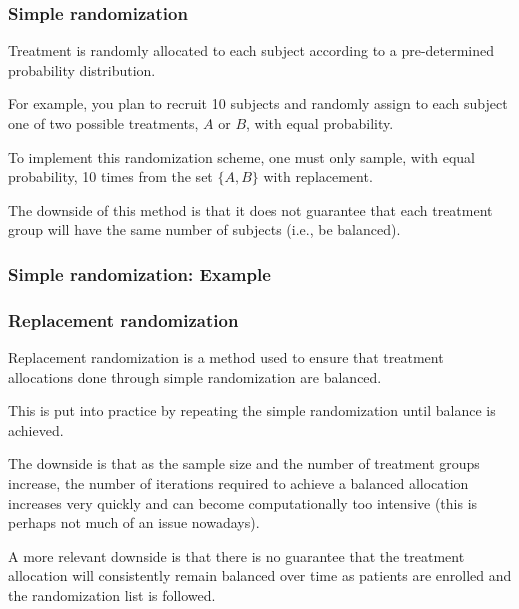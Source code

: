 \documentclass{beamer}
\begin{document}
\begin{frame}
    \frametitle{Simple randomization}
	Treatment is randomly allocated to each subject according to a pre-determined probability distribution.

    \pause
	
	\bigskip
	
	For example, you plan to recruit 10 subjects and randomly assign to each subject 
	one of two possible treatments, $A$ or $B$, with equal probability.

    \pause
	
	\bigskip
	
	To implement this randomization scheme, one must only sample, with equal probability,
	10 times from the set $\{A, B\}$ with replacement.

    \pause
	
	\bigskip
	
	The downside of this method is that it does not guarantee that each treatment group will
	have the same number of subjects (i.e., be balanced).
\end{frame}


\begin{frame}[fragile]
    \frametitle{Simple randomization: Example}
	
\end{frame}


\begin{frame}
    \frametitle{Replacement randomization}
	Replacement randomization is a method used to ensure that treatment allocations
	done through simple randomization are balanced.

    \pause
	
	\bigskip
	
	This is put into practice by repeating the simple randomization until balance is achieved.

    \pause
	
	\bigskip
	
	The downside is that as the sample size and the number of treatment groups increase, the number
	of iterations required to achieve a balanced allocation increases very quickly and can
	become computationally too intensive (this is perhaps not much of an issue nowadays).

    \pause
	
	\bigskip
	
	A more relevant downside is that there is no guarantee that the treatment allocation will
	consistently remain balanced over time as patients are enrolled and the randomization
	list is followed.
\end{frame}
\end{document}
